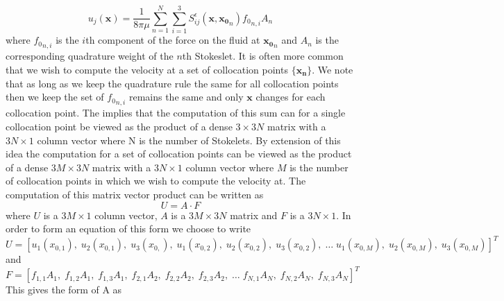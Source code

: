 \begin{equation}
\label{eq:Stokesletsum}
    u_{j}\left(\mathbf{x}\right)=\frac{1}{8 \pi \mu} \sum_{n=1}^{N} \sum_{i=1}^{3} S_{i j}^{\epsilon}\left(\mathbf{x}, \mathbf{x_0}_{n}\right) {f_0}_{n, i} A_{n}
\end{equation}
where ${f_0}_{n, i}$ is the $i$th component of the force on the fluid at $\mathbf{x_0}_n$ and $A_n$ is the corresponding quadrature weight of the $n$th Stokeslet. It is often more common that we wish to compute the velocity at a set of collocation points $\{\mathbf{x_n}\}$. We note that as long as we keep the quadrature rule the same for all collocation points then we keep the set of ${f_0}_{n, i}$ remains the same and only $\mathbf{x}$ changes for each collocation point. The implies that the computation of this sum can for a single collocation point be viewed as the product of a dense $3 \times 3N$ matrix with a $3N \times 1$ column vector where N is the number of Stokelets. By extension of this idea the computation for a set of collocation points can be viewed as the product of a dense $3M \times 3N$ matrix with a $3N \times 1$ column vector where $M$ is the number of collocation points in which we wish to compute the velocity at.  
The computation of this matrix vector product can be written as 
\begin{equation}
\label{eq:matrixvectorproduct}
    U = A \cdot F
\end{equation}
where $U$ is a $3M \times 1$ column vector, $A$ is a $3M \times 3N$ matrix and $F$ is a $3N \times 1$. In order to form an equation of this form we choose to write 
\small
\begin{equation*}
    U = [u_1(x_{0,1}), \; u_2(x_{0,1}), \; u_3(x_{0,}), \; u_1(x_{0,2}), \; u_2(x_{0,2}), \; u_3(x_{0,2}), \; \dots \; u_1(x_{0,M}), \; u_2(x_{0,M}), \; u_3(x_{0,M})]^{T}
\end{equation*}
\normalsize
and 
\small
\begin{equation*}
    F = [f_{1,1}A_1, \; f_{1,2}A_1, \; f_{1,3}A_1, \; f_{2,1}A_2, \; f_{2,2}A_2, \; f_{2,3}A_2, \; \dots \; f_{N,1}A_N, \; f_{N,2}A_N, \; f_{N,3}A_N]^{T}
\end{equation*}
\normalsize
This gives the form of A as 
\small
